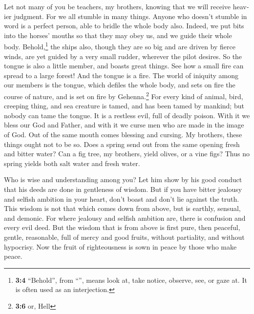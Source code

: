 \begin{paracol}{2}
\begin{otherlanguage}{english}
 Let not many of you be teachers, my brothers, knowing
that we will receive heavier judgment.  For we all stumble
in many things. Anyone who doesn't stumble in word is a perfect person,
able to bridle the whole body also.  Indeed, we put bits
into the horses' mouths so that they may obey us, and we guide their
whole body.  Behold,\footnote{\textbf{3:4} ``Behold'',
  from ``'', means look at, take notice, observe, see, or
  gaze at. It is often used as an interjection.} the ships also, though
they are so big and are driven by fierce winds, are yet guided by a very
small rudder, wherever the pilot desires.  So the tongue
is also a little member, and boasts great things. See how a small fire
can spread to a large forest!  And the tongue is a fire.
The world of iniquity among our members is the tongue, which defiles the
whole body, and sets on fire the course of nature, and is set on fire by
Gehenna.\footnote{\textbf{3:6} or, Hell}  For every kind
of animal, bird, creeping thing, and sea creature is tamed, and has been
tamed by mankind;  but nobody can tame the tongue. It is a
restless evil, full of deadly poison.  With it we bless
our God and Father, and with it we curse men who are made in the image
of God.  Out of the same mouth comes blessing and
cursing. My brothers, these things ought not to be so. 
Does a spring send out from the same opening fresh and bitter water?
 Can a fig tree, my brothers, yield olives, or a vine
figs? Thus no spring yields both salt water and fresh water.

 Who is wise and understanding among you? Let him show by
his good conduct that his deeds are done in gentleness of wisdom.
 But if you have bitter jealousy and selfish ambition in
your heart, don't boast and don't lie against the truth. 
This wisdom is not that which comes down from above, but is earthly,
sensual, and demonic.  For where jealousy and selfish
ambition are, there is confusion and every evil deed. 
But the wisdom that is from above is first pure, then peaceful, gentle,
reasonable, full of mercy and good fruits, without partiality, and
without hypocrisy.  Now the fruit of righteousness is
sown in peace by those who make peace.

\end{otherlanguage}


\end{paracol}
